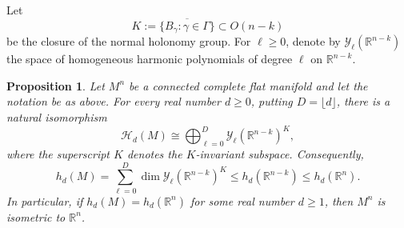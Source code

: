 \documentclass[12pt]{amsart}
\theoremstyle{plain}
\newtheorem{proposition}[theorem]{Proposition}
\theoremstyle{definition}
\theoremstyle{remark}     %
\numberwithin{equation}{section}
\begin{document}
Let
\[
K:=\overline{\{B_\gamma:\gamma\in\Gamma\}}
\subset O(n-k)
\]
be the closure of the normal holonomy group.  For $\ell\geq0$, denote
by $\mathcal Y_\ell(\mathbb R^{n-k})$ the space of homogeneous harmonic
polynomials of degree $\ell$ on $\mathbb R^{n-k}$.

\begin{proposition}
Let $M^n$ be a connected complete flat manifold and let the notation be
as above.  For every real number $d\geq0$, putting $D=\lfloor d\rfloor$, there is a
natural isomorphism
\[
\mathcal H_d(M)
\cong
\bigoplus_{\ell=0}^{D}
\mathcal Y_\ell(\mathbb R^{n-k})^K,
\]
where the superscript $K$ denotes the $K$-invariant subspace.
Consequently,
\[
h_d(M)
=
\sum_{\ell=0}^{D}
\dim\mathcal Y_\ell(\mathbb R^{n-k})^K
\leq
h_d(\mathbb R^{n-k})
\leq
h_d(\mathbb R^n).
\]
In particular, if $h_d(M)=h_d(\mathbb R^n)$
for some real number $d\geq1$, then $M^n$ is isometric to $\mathbb R^n$.
\end{proposition}
\end{document}
